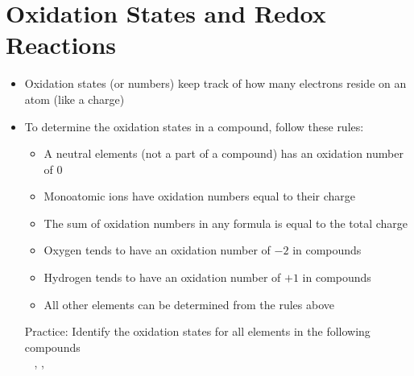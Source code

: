 \documentclass[12pt, openany, letterpaper]{memoir}
\begin{document}
\section{Oxidation States and Redox Reactions}
\begin{itemize}
	\item Oxidation states (or numbers) keep track of how many electrons reside on an atom (like a charge)
	\item To determine the oxidation states in a compound, follow these rules:
	\begin{itemize}
		\item A neutral elements (not a part of a compound) has an oxidation number of $0$
		\item Monoatomic ions have oxidation numbers equal to their charge
		\item The sum of oxidation numbers in any formula is equal to the total charge
		\item Oxygen tends to have an oxidation number of $-2$ in compounds
		\item Hydrogen tends to have an oxidation number of $+1$ in compounds
		\item All other elements can be determined from the rules above
	\end{itemize}

	Practice: Identify the oxidation states for all elements in the following compounds\\
	~\hphantom{Practice: } , , 
	

\end{itemize}
\end{document}
